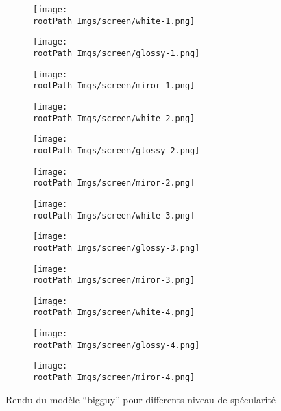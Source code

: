 \documentclass[10pt,a4paper,twoside, twocolumn]{report}
\newcommand*{\rootPath}{../}
\begin{document}
\begin{figure*}[!ht]\centering

	\begin{subfigure}[b]{0.3\textwidth}\centering
		\texttt{[image: \\rootPath Imgs/screen/white-1.png]}
	\end{subfigure}
	\begin{subfigure}[b]{0.3\textwidth}\centering
		\texttt{[image: \\rootPath Imgs/screen/glossy-1.png]}
	\end{subfigure}
	\begin{subfigure}[b]{0.3\textwidth}\centering
		\texttt{[image: \\rootPath Imgs/screen/miror-1.png]}
	\end{subfigure}
	
	\begin{subfigure}[b]{0.3\textwidth}\centering
		\texttt{[image: \\rootPath Imgs/screen/white-2.png]}
	\end{subfigure}
	\begin{subfigure}[b]{0.3\textwidth}\centering
		\texttt{[image: \\rootPath Imgs/screen/glossy-2.png]}
	\end{subfigure}
	\begin{subfigure}[b]{0.3\textwidth}\centering
		\texttt{[image: \\rootPath Imgs/screen/miror-2.png]}
	\end{subfigure}
	
	\begin{subfigure}[b]{0.3\textwidth}\centering
		\texttt{[image: \\rootPath Imgs/screen/white-3.png]}
	\end{subfigure}
	\begin{subfigure}[b]{0.3\textwidth}\centering
		\texttt{[image: \\rootPath Imgs/screen/glossy-3.png]}
	\end{subfigure}
	\begin{subfigure}[b]{0.3\textwidth}\centering
		\texttt{[image: \\rootPath Imgs/screen/miror-3.png]}
	\end{subfigure}
	
	\begin{subfigure}[b]{0.3\textwidth}\centering
		\texttt{[image: \\rootPath Imgs/screen/white-4.png]}
	\end{subfigure}
	\begin{subfigure}[b]{0.3\textwidth}\centering
		\texttt{[image: \\rootPath Imgs/screen/glossy-4.png]}
	\end{subfigure}
	\begin{subfigure}[b]{0.3\textwidth}\centering
		\texttt{[image: \\rootPath Imgs/screen/miror-4.png]}
	\end{subfigure}

	\caption{Rendu du modèle “bigguy” pour differents niveau de spécularité}
	\label{fig:result:specularity}
\end{figure*}
\end{document}
